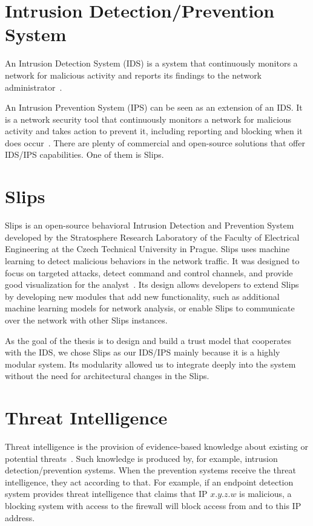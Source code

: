 \section{Intrusion Detection/Prevention System}
\label{sec:intrusion-detection-prevention-system}
An Intrusion Detection System (IDS) is a system that continuously monitors a network for malicious activity and reports its findings to the network administrator~\cite{bace2001intrusion}.

An Intrusion Prevention System (IPS) can be seen as an extension of an IDS. 
It is a network security tool that continuously monitors a network for malicious activity and takes action to prevent it, including reporting and blocking when it does occur~\cite{zhang2004intrusion}.
There are plenty of commercial and open-source solutions that offer IDS/IPS capabilities. One of them is Slips.


\section{Slips}
\label{sec:slips}
Slips is an open-source behavioral Intrusion Detection and Prevention System developed by the Stratosphere Research Laboratory of the Faculty of Electrical Engineering at the Czech Technical University in Prague.
Slips uses machine learning to detect malicious behaviors in the network traffic. It was designed to focus on targeted attacks, detect command and control channels, and provide good visualization for the analyst~\cite{slips}.
Its design allows developers to extend Slips by developing new modules that add new functionality, such as additional machine learning models for network analysis, or enable Slips to communicate over the network with other Slips instances.

As the goal of the thesis is to design and build a trust model that cooperates with the IDS, we chose Slips as our IDS/IPS mainly because it is a highly modular system.
Its modularity allowed us to integrate deeply into the system without the need for architectural changes in the Slips.

\section{Threat Intelligence}
\label{sec:threat-intelligence}
Threat intelligence is the provision of evidence-based knowledge about existing or potential threats~\cite{threatintelligence}.
Such knowledge is produced by, for example, intrusion 
detection/prevention systems.
When the prevention systems receive the threat intelligence, they act according to that.
For example, if an endpoint detection system provides threat intelligence that claims that IP $x.y.z.w$ is malicious, a blocking system with access to the firewall will block access from and to this IP address.

